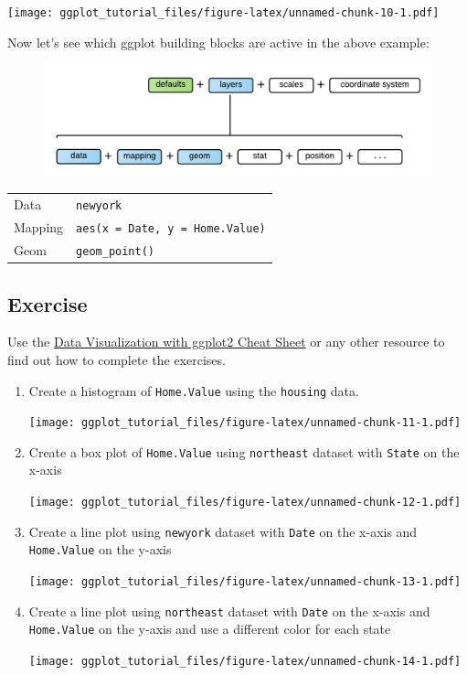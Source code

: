 \documentclass[]{article}
\theoremstyle{definition}
\theoremstyle{definition}
\theoremstyle{definition}
\theoremstyle{remark}
\begin{document}
\texttt{[image: ggplot\_tutorial\_files/figure-latex/unnamed-chunk-10-1.pdf]}

Now let's see which ggplot building blocks are active in the above
example:

\begin{figure}[htbp]
\centering
\includegraphics{./img/ggplot2_basics.png}
\caption{}
\end{figure}

\begin{longtable}[c]{@{}ll@{}}
\toprule
Data & \texttt{newyork}\tabularnewline
Mapping & \texttt{aes(x\ =\ Date,\ y\ =\ Home.Value)}\tabularnewline
Geom & \texttt{geom\_point()}\tabularnewline
\bottomrule
\end{longtable}

\subsection{Exercise}\label{exercise}

Use the
\href{https://www.rstudio.com/wp-content/uploads/2015/03/ggplot2-cheatsheet.pdf}{Data
Visualization with ggplot2 Cheat Sheet} or any other resource to find
out how to complete the exercises.

\begin{enumerate}
\def\labelenumi{\arabic{enumi}.}
\item
  Create a histogram of \texttt{Home.Value} using the \texttt{housing}
  data.

  \texttt{[image: ggplot\_tutorial\_files/figure-latex/unnamed-chunk-11-1.pdf]}
\item
  Create a box plot of \texttt{Home.Value} using \texttt{northeast}
  dataset with \texttt{State} on the x-axis

  \texttt{[image: ggplot\_tutorial\_files/figure-latex/unnamed-chunk-12-1.pdf]}
\item
  Create a line plot using \texttt{newyork} dataset with \texttt{Date}
  on the x-axis and \texttt{Home.Value} on the y-axis

  \texttt{[image: ggplot\_tutorial\_files/figure-latex/unnamed-chunk-13-1.pdf]}
\item
  Create a line plot using \texttt{northeast} dataset with \texttt{Date}
  on the x-axis and \texttt{Home.Value} on the y-axis and use a
  different color for each state

  \texttt{[image: ggplot\_tutorial\_files/figure-latex/unnamed-chunk-14-1.pdf]}
\end{enumerate}
\end{document}

